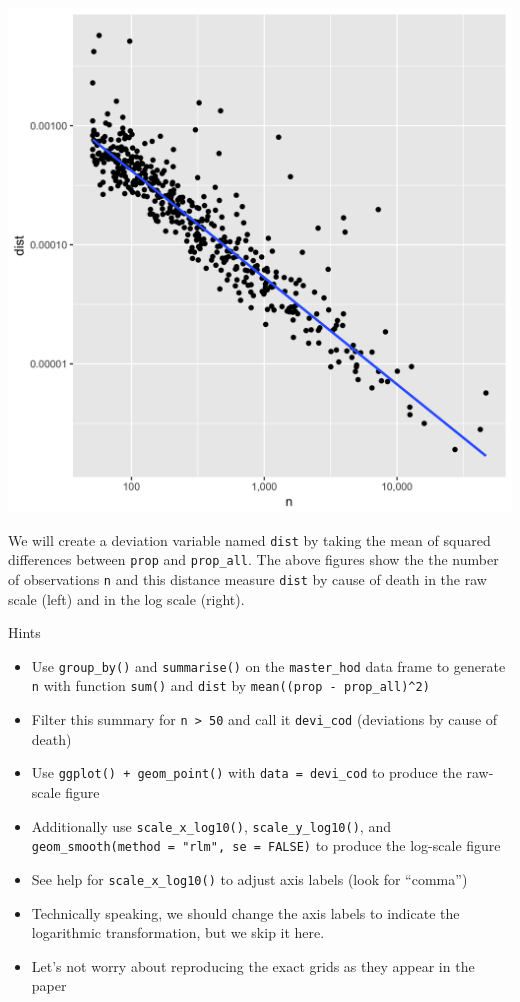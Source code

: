 \documentclass[]{book}
\theoremstyle{definition}
\theoremstyle{definition}
\theoremstyle{remark}
\begin{document}
\begin{center}\includegraphics[width=0.5\linewidth]{tidy_case_study/n-dist-log} \end{center}

We will create a deviation variable named \texttt{dist} by taking the
mean of squared differences between \texttt{prop} and
\texttt{prop\_all}. The above figures show the the number of
observations \texttt{n} and this distance measure \texttt{dist} by cause
of death in the raw scale (left) and in the log scale (right).

Hints

\begin{itemize}
\item
  Use \texttt{group\_by()} and \texttt{summarise()} on the
  \texttt{master\_hod} data frame to generate \texttt{n} with function
  \texttt{sum()} and \texttt{dist} by
  \texttt{mean((prop\ -\ prop\_all)\^{}2)}
\item
  Filter this summary for \texttt{n\ \textgreater{}\ 50} and call it
  \texttt{devi\_cod} (deviations by cause of death)
\item
  Use \texttt{ggplot()\ +\ geom\_point()} with
  \texttt{data\ =\ devi\_cod} to produce the raw-scale figure
\item
  Additionally use \texttt{scale\_x\_log10()},
  \texttt{scale\_y\_log10()}, and
  \texttt{geom\_smooth(method\ =\ "rlm",\ se\ =\ FALSE)} to produce the
  log-scale figure
\item
  See help for \texttt{scale\_x\_log10()} to adjust axis labels (look
  for ``comma'')
\item
  Technically speaking, we should change the axis labels to indicate the
  logarithmic transformation, but we skip it here.
\item
  Let's not worry about reproducing the exact grids as they appear in
  the paper
\end{itemize}
\end{document}
